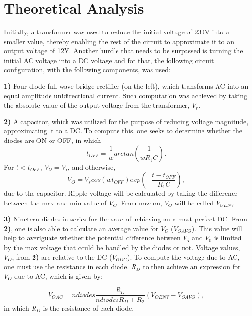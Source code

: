 \section{Theoretical Analysis}
\label{sec:analysis}
\paragraph{}
\par Initially, a transformer was used to reduce the initial voltage of 230V into a smaller value, thereby enabling the rest of the circuit to approximate it to an output voltage of 12V. Another hurdle that needs to be surpassed is turning the initial AC voltage into a DC voltage and for that, the following circuit configuration, with the following components, was used:
\par \textbf{1)} Four diode full wave bridge rectifier (on the left), which transforms AC into an equal amplitude unidirectional current. Such computation was achieved by taking the absolute value of the output voltage from the transformer, $V_r$.
\par \textbf{2)} A capacitor, which was utilized for the purpose of reducing voltage magnitude, approximating it to a DC. To compute this, one seeks to determine whether the diodes are ON or OFF, in which
\begin{equation}
	t_{OFF}= \frac{1}{w} arctan(\frac{1}{w R_1 C}). 
\end{equation}
For $t<t_{OFF}$, $V_O=V_r$, and otherwise, 
\begin{equation}
	V_O=V_s cos(w t_{OFF}) exp(-\frac{t-t_{OFF}}{R_1 C}), 
\end{equation}
due to the capacitor. Ripple voltage will be calculated by taking the difference between the max and min value of $V_O$. From now on, $V_O$ will be called $V_{OENV}$.
\par \textbf{3)} Nineteen diodes in series for the sake of achieving an almost perfect DC. From \textbf{2)}, one is also able to calculate an average value for $V_O$ ($V_{OAVG}$). This value will help to averiguate whether the potential difference between $V_5$ and $V_0$ is limited by the max voltage that could be handled by the diodes or not. Voltage values, $V_O$, from \textbf{2)} are relative to the DC ($V_{ODC}$). To compute the voltage due to AC, one must use the resistance in each diode. $R_D$ to then achieve an expression for $V_O$ due to AC, which is given by:

\begin{equation}
	V_{OAC} = ndiodes \frac{R_D}{ndiodes R_D + R_2}(V_{OENV} - V_{OAVG}),
\end{equation}
in which $R_D$ is the resistance of each diode.

